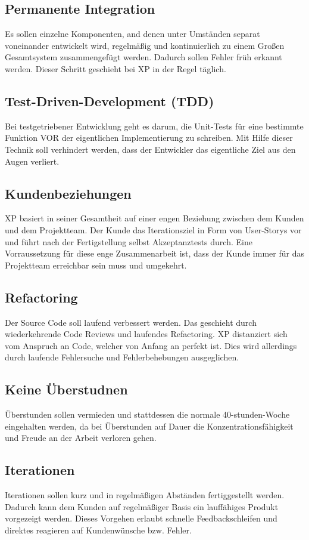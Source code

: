 \documentclass[a4paper, twopage]{scrreprt}
\begin{document}
\subsection{Permanente Integration}
Es sollen einzelne Komponenten, and denen unter Umständen separat voneinander entwickelt wird, regelmäßig und kontinuierlich zu einem Großen Gesamtsystem zusammengefügt werden. Dadurch sollen Fehler früh erkannt werden. Dieser Schritt geschieht bei XP in der Regel täglich.
\subsection{Test-Driven-Development (TDD)}
\label{subsec_tdd}
Bei testgetriebener Entwicklung geht es darum, die Unit-Tests für eine bestimmte Funktion VOR der eigentlichen Implementierung zu schreiben. Mit Hilfe dieser Technik soll verhindert werden, dass der Entwickler das eigentliche Ziel aus den Augen verliert.
\subsection{Kundenbeziehungen}
XP basiert in seiner Gesamtheit auf einer engen Beziehung zwischen dem Kunden und dem Projektteam. Der Kunde das Iterationsziel in Form von User-Storys vor und führt nach der Fertigstellung selbst Akzeptanztests durch. Eine Vorraussetzung für diese enge Zusammenarbeit ist, dass der Kunde immer für das Projektteam erreichbar sein muss und umgekehrt.
\subsection{Refactoring}
Der Source Code soll laufend verbessert werden. Das geschieht durch wiederkehrende Code Reviews und laufendes Refactoring. XP distanziert sich vom Anspruch an Code, welcher von Anfang an perfekt ist. Dies wird allerdings durch laufende Fehlersuche und Fehlerbehebungen ausgeglichen.
\subsection{Keine Überstudnen}
Überstunden sollen vermieden und stattdessen die normale 40-stunden-Woche eingehalten werden, da bei Überstunden auf Dauer die Konzentrationsfähigkeit und Freude an der Arbeit verloren gehen.
\subsection{Iterationen}
Iterationen sollen kurz und in regelmäßigen Abständen fertiggestellt werden. Dadurch kann dem Kunden auf regelmäßiger Basis ein lauffähiges Produkt vorgezeigt werden. Dieses Vorgehen erlaubt schnelle Feedbackschleifen und direktes reagieren auf Kundenwünsche bzw. Fehler.
\end{document}

